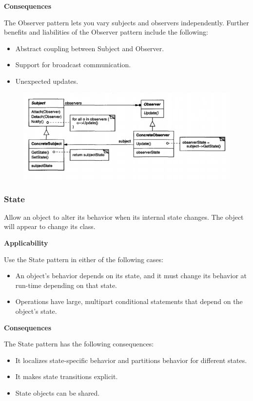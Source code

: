 \documentclass{article}
\begin{document}
\textbf{Consequences}

The Observer pattern lets you vary subjects and observers independently. Further benefits and liabilities of the Observer pattern include the following:
\begin{itemize}
    \item Abstract coupling between Subject and Observer.
    \item Support for broadcast communication.
    \item Unexpected updates.
\end{itemize}

\begin{figure}[h]
    \centering
    \includegraphics[width=14cm]{diagrams/pattern-19-observer.png}
\end{figure}

\newpage
\subsubsection{State}
Allow an object to alter its behavior when its internal state changes. The object will appear to change its class.

\textbf{Applicability}

Use the State pattern in either of the following cases:

\begin{itemize}
    \item An object's behavior depends on its state, and it must change its behavior at run-time depending on that state. 
    \item Operations have large, multipart conditional statements that depend on the object's state. 
\end{itemize}

\textbf{Consequences}

The State pattern has the following consequences:
\begin{itemize}
    \item It localizes state-specific behavior and partitions behavior for different states.
    \item It makes state transitions explicit.
    \item State objects can be shared.
\end{itemize}
\end{document}
